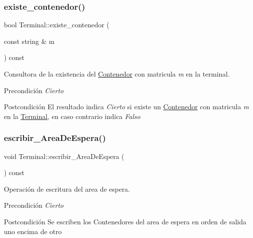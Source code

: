 \subsubsection{\texorpdfstring{existe\+\_\+contenedor()}{existe\_contenedor()}}
{\footnotesize\ttfamily bool Terminal\+::existe\+\_\+contenedor (\begin{DoxyParamCaption}\item[{const string \&}]{m }\end{DoxyParamCaption}) const}



Consultora de la existencia del \hyperlink{class_contenedor}{Contenedor} con matricula {\itshape m} en la terminal. 

\begin{DoxyPrecond}{Precondición}
{\itshape Cierto} 
\end{DoxyPrecond}
\begin{DoxyPostcond}{Postcondición}
El resultado indica {\itshape Cierto} si existe un \hyperlink{class_contenedor}{Contenedor} con matricula {\itshape m} en la \hyperlink{class_terminal}{Terminal}, en caso contrario indica {\itshape Falso} 
\end{DoxyPostcond}
\mbox{\label{class_terminal_a3da2635443b21d89e5fecc47153a888f}} 
\subsubsection{\texorpdfstring{escribir\+\_\+\+Area\+De\+Espera()}{escribir\_AreaDeEspera()}}
{\footnotesize\ttfamily void Terminal\+::escribir\+\_\+\+Area\+De\+Espera (\begin{DoxyParamCaption}{ }\end{DoxyParamCaption}) const}



Operación de escritura del area de espera. 

\begin{DoxyPrecond}{Precondición}
{\itshape Cierto} 
\end{DoxyPrecond}
\begin{DoxyPostcond}{Postcondición}
Se escriben los Contenedores del area de espera en orden de salida uno encima de otro 
\end{DoxyPostcond}
\mbox{\label{class_terminal_a24c74e2dd8c8e41452a7e890bc925f0e}} 
